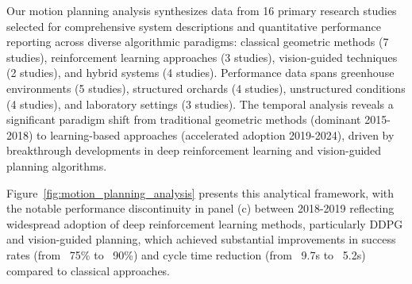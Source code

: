 \documentclass{ieeeaccess}
\begin{document}
Our motion planning analysis synthesizes data from 16 primary research studies selected for comprehensive system descriptions and quantitative performance reporting across diverse algorithmic paradigms: classical geometric methods (7 studies), reinforcement learning approaches (3 studies), vision-guided techniques (2 studies), and hybrid systems (4 studies). Performance data spans greenhouse environments (5 studies), structured orchards (4 studies), unstructured conditions (4 studies), and laboratory settings (3 studies). The temporal analysis reveals a significant paradigm shift from traditional geometric methods (dominant 2015-2018) to learning-based approaches (accelerated adoption 2019-2024), driven by breakthrough developments in deep reinforcement learning and vision-guided planning algorithms.

Figure~\ref{fig:motion_planning_analysis} presents this analytical framework, with the notable performance discontinuity in panel (c) between 2018-2019 reflecting widespread adoption of deep reinforcement learning methods, particularly DDPG and vision-guided planning, which achieved substantial improvements in success rates (from ~75\% to ~90\%) and cycle time reduction (from ~9.7s to ~5.2s) compared to classical approaches.
\end{document}
